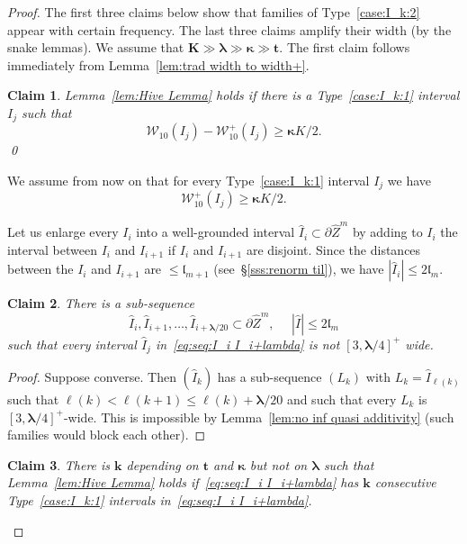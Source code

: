 \documentclass{amsart}
\renewcommand{\sp}{{\ \ }}
\newcommand{\1}{{\mathbb 1 }}
\newcommand{\blambda}{{\boldsymbol\lambda}}
\newcommand{\bkappa}{{\boldsymbol\kappa}}
\newcommand{\Width}{{\mathcal W}}
\newcommand{\wI}{{\widehat I}}
\newcommand{\wZ}{{\widehat Z}}
\newcommand{\bK}{{\mathbf K}}
\newcommand{\bbk}{{\mathbf k}}
\newcommand{\bbt}{{\mathbf t}}
\newcommand{\length}{{\mathfrak l}}
\newtheorem{claim}{Claim}
\theoremstyle{remark}
\numberwithin{equation}{section}
\theoremstyle{definition}
\begin{document}
\begin{proof}
The first three claims below show that families of Type~\eqref{case:I_k:2} appear with certain frequency. The last three claims amplify their width (by the snake lemmas).
We assume that $\bK \gg\blambda \gg \bkappa\gg \bbt$. The first claim follows immediately from Lemma~\ref{lem:trad width to width+}. 

\begin{claim}
Lemma~\ref{lem:Hive Lemma} holds if there is a Type~\eqref{case:I_k:1} interval $I_j$ such that \[\Width_{10}(I_j)-\Width^+_{10}(I_j)\ge \bkappa  K/2.\] \qed
\end{claim}


We assume from now on that for every Type~\eqref{case:I_k:1} interval $I_j$ we have
\begin{equation}
\label{eq:Type1inerv:ass1}
\Width^+_{10}(I_j)\ge \bkappa K/2.
\end{equation}


Let us enlarge every $I_i$ into a well-grounded interval $\wI_i\subset \partial \wZ^m$ by adding to $I_i$ the interval between $I_i$ and $I_{i+1}$ if $I_i$ and $I_{i+1}$ are disjoint. Since the distances between the $I_i$ and $I_{i+1}$ are $\le \length_{m+1}$ (see~\S\ref{sss:renorm til}), we have $|\wI_i|\le 2 \length_m$.



\begin{claim}
\label{cl:seq:I_i}
There is a sub-sequence \begin{equation}
\label{eq:seq:I_i  I_i+lambda}
\wI_{i}, \wI_{i+1},\dots, \wI_{i+\blambda/20}\subset\partial \wZ^m, \sp\sp\sp |\wI|\le 2 \length_m
\end{equation}
such that  every interval $\wI_j$ in~\eqref{eq:seq:I_i  I_i+lambda} is not $[3,\blambda/4]^+$ wide.
\end{claim} 
 \begin{proof}
Suppose converse. Then $(\wI_k)$ has a sub-sequence $(L_k)$ with $L_k=\wI_{\ell(k)}$ such that $\ell(k)<\ell(k+1)\le \ell(k)+\blambda/20$ and such that every $L_k$ is $[3,\blambda/4]^+$-wide. This is impossible by Lemma~\ref{lem:no inf quasi additivity}  (such families would block each other).
\end{proof}





\begin{claim}
There is $\bbk$ depending on $\bbt$ and $\bkappa$ but not on $\blambda$ such that Lemma~\ref{lem:Hive Lemma} holds if~\eqref{eq:seq:I_i  I_i+lambda} has $\bbk$ consecutive Type~\eqref{case:I_k:1} intervals in~\eqref{eq:seq:I_i  I_i+lambda}. 
\end{claim}


\end{proof}
\end{document}
